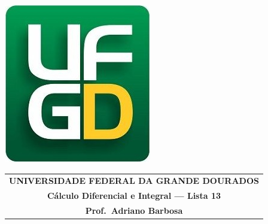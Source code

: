 \documentclass[a4paper,5pt]{amsbook}
\begin{document}
\thispagestyle{empty}
\pagestyle{empty}
\begin{minipage}[h]{0.14\textwidth}
	\includegraphics[scale=0.24]{../ufgd.png}
\end{minipage}
\begin{minipage}[h]{\textwidth}
\begin{tabular}{c}
{{\bf UNIVERSIDADE FEDERAL DA GRANDE DOURADOS}}\\
{{\bf C\'alculo Diferencial e Integral --- Lista 13}}\\
{{\bf Prof.\ Adriano Barbosa}}\\
\end{tabular}
\vspace{-0.45cm}
%
\end{minipage}

\end{document}
